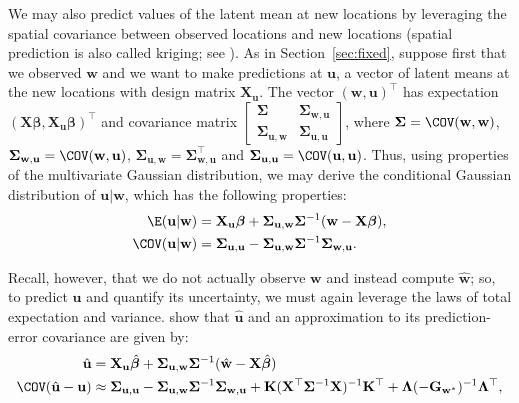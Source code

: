 \documentclass[
]{jss}
\begin{document}
We may also predict values of the latent mean at new locations by
leveraging the spatial covariance between observed locations and new
locations (spatial prediction is also called kriging; see
\citet{cressie1990origins}). As in Section~\ref{sec:fixed}, suppose
first that we observed \(\mathbf{w}\) and we want to make predictions at
\(\mathbf{u}\), a vector of latent means at the new locations with
design matrix \(\mathbf{X}_{\mathbf{u}}\). The vector
\((\mathbf{w}, \mathbf{u})^\top\) has expectation
\((\mathbf{X}\boldsymbol{\beta}, \mathbf{X}_\mathbf{u}\boldsymbol{\beta})^\top\)
and covariance matrix
\(\begin{bmatrix} \boldsymbol{\Sigma} & \boldsymbol{\Sigma}_{\mathbf{w},\mathbf{u}} \\ \boldsymbol{\Sigma}_{\mathbf{u},\mathbf{w}} & \boldsymbol{\Sigma}_{\mathbf{u},\mathbf{u}} \end{bmatrix}\),
where \(\boldsymbol{\Sigma} = \COV(\mathbf{w}, \mathbf{w})\),
\(\boldsymbol{\Sigma}_{\mathbf{w},\mathbf{u}} = \COV(\mathbf{w}, \mathbf{u})\),
\(\boldsymbol{\Sigma}_{\mathbf{u},\mathbf{w}} = \boldsymbol{\Sigma}_{\mathbf{w},\mathbf{u}}^\top\)
and
\(\boldsymbol{\Sigma}_{\mathbf{u},\mathbf{u}} = \COV(\mathbf{u}, \mathbf{u})\).
Thus, using properties of the multivariate Gaussian distribution, we may
derive the conditional Gaussian distribution of
\(\mathbf{u}|\mathbf{w}\), which has the following properties:
\begin{align}
   \E(\mathbf{u} | \mathbf{w}) & = \mathbf{X}_{\mathbf{u}} \boldsymbol{\beta} + \boldsymbol{\Sigma}_{\mathbf{u}, \mathbf{w}}\boldsymbol{\Sigma}^{-1}(\mathbf{w} - \mathbf{X}\boldsymbol{\beta}), \\
  \COV(\mathbf{u} | \mathbf{w}) & = \boldsymbol{\Sigma}_{\mathbf{u}, \mathbf{u}} - \boldsymbol{\Sigma}_{\mathbf{u}, \mathbf{w}} \boldsymbol{\Sigma}^{-1} \boldsymbol{\Sigma}_{\mathbf{w}, \mathbf{u}}.
\end{align}

Recall, however, that we do not actually observe \(\mathbf{w}\) and
instead compute \(\hat{\mathbf{w}}\); so, to predict \(\mathbf{u}\) and
quantify its uncertainty, we must again leverage the laws of total
expectation and variance. \citet{ver2024marginal} show that
\(\hat{\mathbf{u}}\) and an approximation to its prediction-error
covariance are given by: \begin{align}
  \hat{\mathbf{u}} & = \mathbf{X}_{\mathbf{u}} \hat{\boldsymbol{\beta}} + \boldsymbol{\Sigma}_{\mathbf{u}, \mathbf{w}}\boldsymbol{\Sigma}^{-1}(\hat{\mathbf{w}} - \mathbf{X}\hat{\boldsymbol{\beta}}) \\
  \COV(\hat{\mathbf{u}} - \mathbf{u}) & \approx \boldsymbol{\Sigma}_{\mathbf{u},\mathbf{u}} - \boldsymbol{\Sigma}_{\mathbf{u},\mathbf{w}} \boldsymbol{\Sigma}^{-1} \boldsymbol{\Sigma}_{\mathbf{w},\mathbf{u}} + \mathbf{K}(\mathbf{X}^\top \boldsymbol{\Sigma}^{-1}\mathbf{X})^{-1}\mathbf{K}^\top + \boldsymbol{\Lambda}(-\mathbf{G}_{\mathbf{w}^{*}})^{-1}\boldsymbol{\Lambda}^\top,
\end{align}
\end{document}

